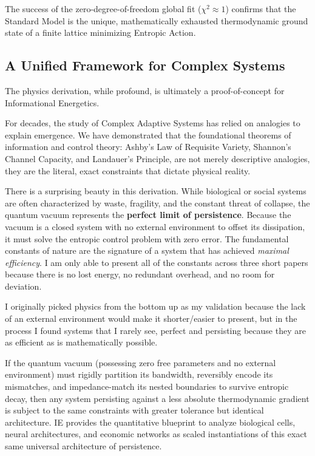 The success of the zero-degree-of-freedom global fit ($\chi^2 \approx 1$) confirms that the Standard Model is the unique, mathematically exhausted thermodynamic ground state of a finite lattice minimizing Entropic Action.

\subsection{A Unified Framework for Complex Systems}

The physics derivation, while profound, is ultimately a proof-of-concept for Informational Energetics. 

For decades, the study of Complex Adaptive Systems has relied on analogies to explain emergence. We have demonstrated that the foundational theorems of information and control theory: Ashby’s Law of Requisite Variety, Shannon’s Channel Capacity, and Landauer’s Principle, are not merely descriptive analogies, they are the literal, exact constraints that dictate physical reality.

There is a surprising beauty in this derivation. While biological or social systems are often characterized by waste, fragility, and the constant threat of collapse, the quantum vacuum represents the \textbf{perfect limit of persistence}. Because the vacuum is a closed system with no external environment to offset its dissipation, it must solve the entropic control problem with zero error. The fundamental constants of nature are the signature of a system that has achieved \textit{maximal efficiency}. I am only able to present all of the constants across three short papers because there is no lost energy, no redundant overhead, and no room for deviation. 

I originally picked physics from the bottom up as my validation because the lack of an external environment would make it shorter/easier to present, but in the process I found systems that I rarely see, perfect and persisting because they are as efficient as is mathematically possible.

If the quantum vacuum (possessing zero free parameters and no external environment) must rigidly partition its bandwidth, reversibly encode its mismatches, and impedance-match its nested boundaries to survive entropic decay, then any system persisting against a less absolute thermodynamic gradient is subject to the same constraints with greater tolerance but identical architecture. IE provides the quantitative blueprint to analyze biological cells, neural architectures, and economic networks as scaled instantiations of this exact same universal architecture of persistence. 

